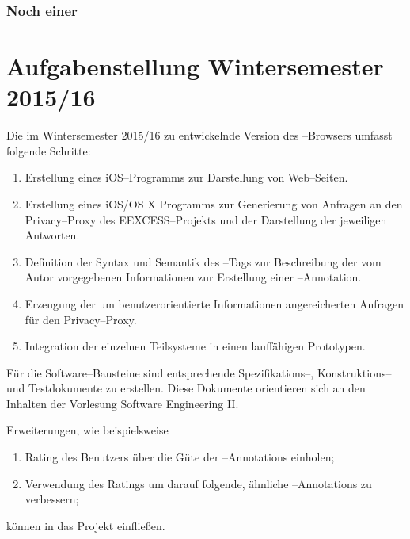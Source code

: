 \subsubsection{Noch einer}

\section{Aufgabenstellung Wintersemester 2015/16}
Die im Wintersemester 2015/16 zu entwickelnde Version des
\SECH--Browsers umfasst folgende Schritte:
\begin{enumerate}
     \item Erstellung eines iOS--Programms zur Darstellung von
    Web--Seiten.
     \item Erstellung eines iOS/OS X Programms zur Generierung von
    Anfragen an den Privacy--Proxy des EEXCESS--Projekts und der
    Darstellung der jeweiligen Antworten.
     \item Definition der Syntax und Semantik des \SEACH--Tags
    zur Beschreibung der vom Autor vorgegebenen Informationen zur
    Erstellung einer \SECH--Annotation.
     \item Erzeugung der um benutzerorientierte Informationen
    angereicherten Anfragen für den Privacy--Proxy.
     \item Integration der einzelnen Teilsysteme in einen lauffähigen
    Prototypen. 
\end{enumerate}
Für die Software--Bausteine sind entsprechende Spezifikations--,
Konstruktions-- und Testdokumente zu erstellen. Diese Dokumente
orientieren sich an den Inhalten der Vorlesung \glqq Software
Engineering II\grqq.
 
Erweiterungen, wie beispielsweise
\begin{enumerate}
     \item Rating des Benutzers über die Güte der \SECH--Annotations einholen;
     \item Verwendung des Ratings um darauf folgende, ähnliche
    \SECH--Annotations zu verbessern;
\end{enumerate}
können in das Projekt einfließen.